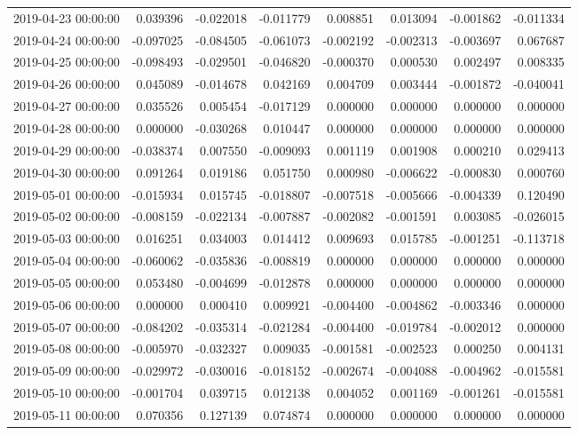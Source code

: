\begin{tabular}{lrrrrrrr}
2019-04-23 00:00:00 & 0.039396 & -0.022018 & -0.011779 & 0.008851 & 0.013094 & -0.001862 & -0.011334 \\
2019-04-24 00:00:00 & -0.097025 & -0.084505 & -0.061073 & -0.002192 & -0.002313 & -0.003697 & 0.067687 \\
2019-04-25 00:00:00 & -0.098493 & -0.029501 & -0.046820 & -0.000370 & 0.000530 & 0.002497 & 0.008335 \\
2019-04-26 00:00:00 & 0.045089 & -0.014678 & 0.042169 & 0.004709 & 0.003444 & -0.001872 & -0.040041 \\
2019-04-27 00:00:00 & 0.035526 & 0.005454 & -0.017129 & 0.000000 & 0.000000 & 0.000000 & 0.000000 \\
2019-04-28 00:00:00 & 0.000000 & -0.030268 & 0.010447 & 0.000000 & 0.000000 & 0.000000 & 0.000000 \\
2019-04-29 00:00:00 & -0.038374 & 0.007550 & -0.009093 & 0.001119 & 0.001908 & 0.000210 & 0.029413 \\
2019-04-30 00:00:00 & 0.091264 & 0.019186 & 0.051750 & 0.000980 & -0.006622 & -0.000830 & 0.000760 \\
2019-05-01 00:00:00 & -0.015934 & 0.015745 & -0.018807 & -0.007518 & -0.005666 & -0.004339 & 0.120490 \\
2019-05-02 00:00:00 & -0.008159 & -0.022134 & -0.007887 & -0.002082 & -0.001591 & 0.003085 & -0.026015 \\
2019-05-03 00:00:00 & 0.016251 & 0.034003 & 0.014412 & 0.009693 & 0.015785 & -0.001251 & -0.113718 \\
2019-05-04 00:00:00 & -0.060062 & -0.035836 & -0.008819 & 0.000000 & 0.000000 & 0.000000 & 0.000000 \\
2019-05-05 00:00:00 & 0.053480 & -0.004699 & -0.012878 & 0.000000 & 0.000000 & 0.000000 & 0.000000 \\
2019-05-06 00:00:00 & 0.000000 & 0.000410 & 0.009921 & -0.004400 & -0.004862 & -0.003346 & 0.000000 \\
2019-05-07 00:00:00 & -0.084202 & -0.035314 & -0.021284 & -0.004400 & -0.019784 & -0.002012 & 0.000000 \\
2019-05-08 00:00:00 & -0.005970 & -0.032327 & 0.009035 & -0.001581 & -0.002523 & 0.000250 & 0.004131 \\
2019-05-09 00:00:00 & -0.029972 & -0.030016 & -0.018152 & -0.002674 & -0.004088 & -0.004962 & -0.015581 \\
2019-05-10 00:00:00 & -0.001704 & 0.039715 & 0.012138 & 0.004052 & 0.001169 & -0.001261 & -0.015581 \\
2019-05-11 00:00:00 & 0.070356 & 0.127139 & 0.074874 & 0.000000 & 0.000000 & 0.000000 & 0.000000 \\

\end{tabular}
